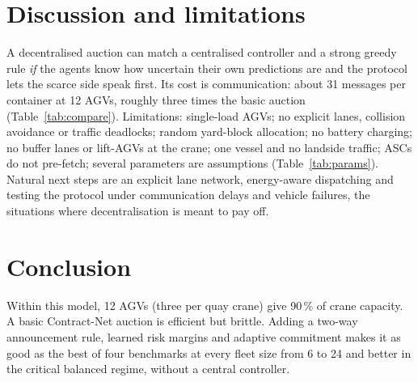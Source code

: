 \documentclass[11pt,a4paper]{article}
\begin{document}
\section{Discussion and limitations}
A decentralised auction can match a centralised controller and a strong greedy rule \emph{if} the agents know
how uncertain their own predictions are and the protocol lets the scarce side speak first. Its cost is
communication: about 31 messages per container at 12 AGVs, roughly three times the basic auction
(Table~\ref{tab:compare}). Limitations: single-load AGVs; no explicit lanes, collision avoidance or traffic
deadlocks; random yard-block allocation; no battery charging; no buffer lanes or lift-AGVs at the crane; one
vessel and no landside traffic; ASCs do not pre-fetch; several parameters are assumptions (Table~\ref{tab:params}).
Natural next steps are an explicit lane network, energy-aware dispatching and testing the protocol under
communication delays and vehicle failures, the situations where decentralisation is meant to pay off.

\section{Conclusion}
Within this model, 12 AGVs (three per quay crane) give 90\,\% of crane capacity. A basic Contract-Net auction
is efficient but brittle. Adding a two-way announcement rule, learned risk margins and adaptive commitment makes
it as good as the best of four benchmarks at every fleet size from 6 to 24 and better in the critical
balanced regime, without a central controller.
\end{document}
